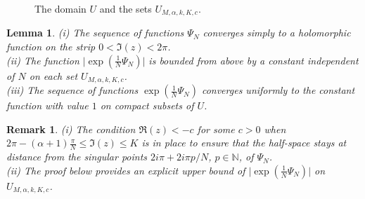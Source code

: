 \documentclass[11pt]{amsart}
\newtheorem{lem}[teo]{Lemma}
\newtheorem{remark}[teo]{Remark}
\newcommand{\mn}{\mathbb{N}}
\begin{document}
{\begin{figure}[!h]
\caption{The domain $U$ and the sets $U_{M,\alpha,k,K,c}$.}\label{fig:Uet+}
\end{figure}
\begin{lem}\label{extboundPsiNjanv26} (i) The sequence of functions $\Psi_N$ converges simply to a holomorphic function on the strip $0 < \mathfrak{I}(z) < 2\pi$.\\
(ii) The function $\textstyle \vert \exp(\frac{1}{N} \Psi_N)\vert$ is bounded from above by a constant independent of $N$ on each set $U_{M,\alpha,k,K,c}$.\\
(iii) The sequence of functions $\textstyle \exp(\frac{1}{N} \Psi_N)$ converges uniformly to the constant function with value $1$ on  compact subsets of $U$.
\end{lem}
\begin{remark}{\rm (i) The condition $\textstyle \mathfrak{R}(z)< -c$ for some $c>0$ when $\textstyle 2\pi-(\alpha+1)\frac{\pi}{N}\leq \mathfrak{I}(z)\leq K$ is in place to ensure that the half-space stays at distance from the singular points $2i\pi+ 2i\pi p/N$, $p\in \mn$, of $\Psi_N$.\\ 
(ii) The proof below provides an explicit upper bound of $\textstyle \vert \exp(\frac{1}{N} \Psi_N)\vert$ on $U_{M,\alpha,k,K,c}$.} \end{remark} 

}
\end{document}
